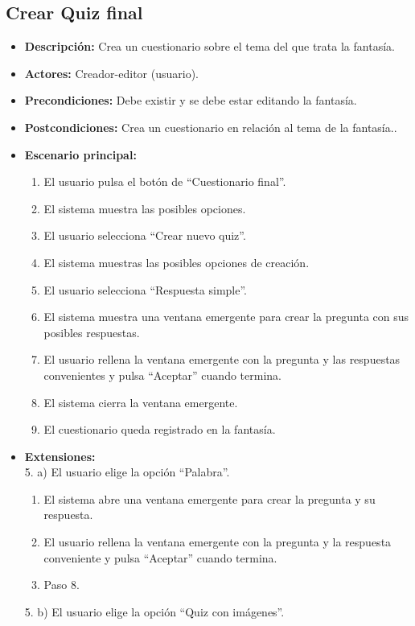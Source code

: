 \documentclass[12pt,letterpaper]{article}
\begin{document}
\subsection{Crear Quiz final}
\begin{itemize}
	\item \textbf{Descripción:} Crea un cuestionario sobre el tema del que trata la fantasía.
	\item \textbf{Actores:} Creador-editor (usuario).
	\item \textbf{Precondiciones:} Debe existir y se debe estar editando la fantasía.
	\item \textbf{Postcondiciones:} Crea un cuestionario en relación al tema de la fantasía..
	\item \textbf{Escenario principal:}
	\begin{enumerate}
		\item El usuario pulsa el botón de ``Cuestionario final''.
		\item El sistema muestra las posibles opciones.
		\item El usuario selecciona ``Crear nuevo quiz''.
		\item El sistema muestras las posibles opciones de creación.
		\item El usuario selecciona ``Respuesta simple''.
		\item El sistema muestra una ventana emergente para crear la pregunta con sus posibles respuestas.
		\item El usuario rellena la ventana emergente con la pregunta y las respuestas convenientes y pulsa ``Aceptar'' cuando termina.
		\item El sistema cierra la ventana emergente.
		\item El cuestionario queda registrado en la fantasía.
	\end{enumerate}
	\item \textbf{Extensiones:} \\5. a) El usuario elige la opción ``Palabra''.
	\begin{enumerate}
		\item El sistema abre una ventana emergente para crear la pregunta y su respuesta.
		\item El usuario rellena la ventana emergente con la pregunta y la respuesta conveniente y pulsa ``Aceptar'' cuando termina.
		\item Paso 8.
	\end{enumerate}
	5. b) El usuario elige la opción ``Quiz con imágenes''.
	\begin{enumerate}

\end{enumerate}
\end{itemize}
\end{document}

